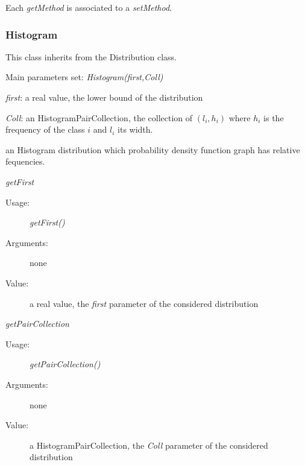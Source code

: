 Each  \textit{getMethod}  is associated to a \textit{setMethod}.


\newpage
\subsubsection{Histogram}

This class inherits from the Distribution class.

\begin{description}

\item[Usage:] \rule{0pt}{1em}
\begin{description}
\item Main parameters set:   \textit{Histogram(first,Coll)}
\end{description}
\bigskip

\item[Arguments:]  \rule{0pt}{1em}
\begin{description}
\item \textit{first}: a  real value, the lower bound of the distribution
\item \textit{Coll}: an HistogramPairCollection, the collection of $(l_i, h_i)$ where $h_i$ is the frequency of the class $i$ and $l_i$ its width.
\end{description}
\bigskip

\item[Value:] an Histogram distribution which probability density function graph has relative fequencies.

\item[Some methods:]  \rule{0pt}{1em}
\begin{description}

\item \textit{getFirst}
\begin{description}
\item[Usage:] \textit{getFirst()}
\item[Arguments:] none
\item[Value:]  a real value, the  \textit{first} parameter of the considered distribution
\end{description}
\bigskip

\item \textit{getPairCollection}
\begin{description}
\item[Usage:] \textit{getPairCollection()}
\item[Arguments:] none
\item[Value:]  a HistogramPairCollection, the  \textit{Coll} parameter of the considered distribution
\end{description}
\bigskip
\end{description}


\end{description}
